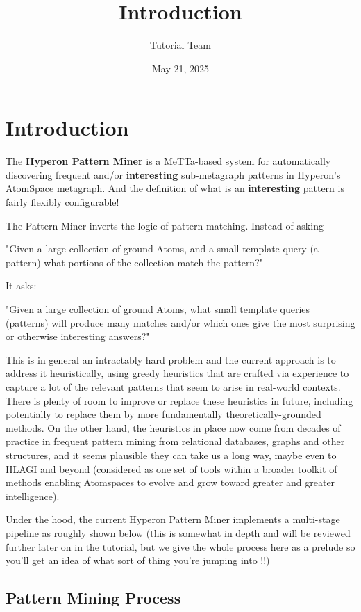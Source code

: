 \documentclass{article}
\title{Introduction }
\author{Tutorial Team}
\date{May 21, 2025}
\begin{document}
\section{Introduction}

The \textbf{Hyperon Pattern Miner} is a MeTTa-based system for automatically discovering  frequent and/or \textbf{interesting}  sub-metagraph patterns in Hyperon's AtomSpace metagraph.   And the definition of what is an \textbf{interesting} pattern is fairly flexibly configurable!

The Pattern Miner inverts the logic of pattern-matching.   Instead of asking


"Given a large collection of ground Atoms, and a small template query (a pattern) what portions of the collection match the pattern?"


It asks:

"Given a large collection of ground Atoms, what small template queries (patterns) will produce many matches and/or which ones give the most surprising or otherwise interesting answers?"


This is in general an intractably hard problem and the current approach is to address it heuristically, using greedy heuristics that are crafted via experience to capture a lot of the relevant patterns that seem to arise in real-world contexts.   There is plenty of room to improve or replace these heuristics in future, including potentially to replace them by more fundamentally theoretically-grounded methods.   On the other hand, the heuristics in place now come from decades of practice in frequent pattern mining from relational databases, graphs and other structures, and it seems plausible they can take us a long way, maybe even to HLAGI and beyond (considered as one set of tools within a broader toolkit of methods enabling Atomspaces to evolve and grow toward greater and greater intelligence).



Under the hood, the current Hyperon Pattern Miner implements a multi-stage pipeline as roughly shown  below (this is somewhat in depth and will be reviewed further later on in the tutorial, but we give the whole process here as a prelude so you'll get an idea of what sort of thing you're jumping into !!)

\subsection{Pattern Mining Process}
\end{document}
